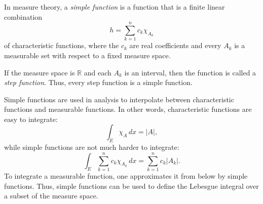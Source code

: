 \documentclass[12pt]{article}
\begin{document}
In measure theory, a \emph{simple function} is a function that is a
finite linear combination
\[
h = \sum_{k=1}^n c_k \chi_{A_k}
\]
of characteristic functions, where the $c_k$ are real coefficients and
every $A_k$ is a measurable set with respect to a fixed measure space.

If the measure space is $\mathbb{R}$ and each $A_k$ is an interval,
then the function is called a \emph{step function}.  Thus, every step
function is a simple function.

Simple functions are used in analysis to interpolate between
characteristic functions and measurable functions.  In other words,
characteristic functions are easy to integrate:
\[
\int_E \chi_{A}\,dx = |A|,
\]
while simple functions are not much harder to integrate:
\[
\int_E \sum_{k=1}^n c_k \chi_{A_k}\,dx = \sum_{k=1}^n c_k |A_k|.
\]
To integrate a measurable function, one approximates it from below by
simple functions.  Thus, simple functions can be used to define the
Lebesgue integral over a subset of the measure space.

\end{document}
